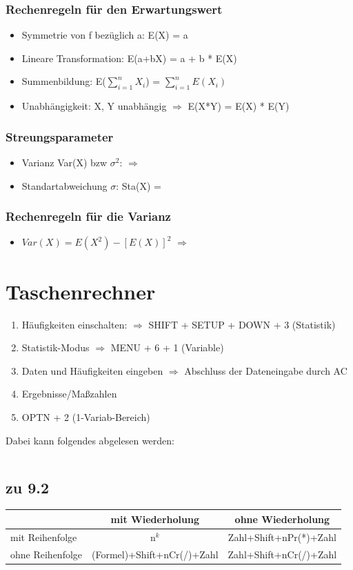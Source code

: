 \documentclass[a4paper,10pt]{scrartcl}
\begin{document}
\subsubsection{Rechenregeln für den Erwartungswert}
\begin{itemize}
    \item Symmetrie von f bezüglich a: E(X) = a
    \item Lineare Transformation: E(a+bX) = a + b * E(X)
    \item Summenbildung: E($\sum_{i=1}^n X_i$) = $\sum_{i=1}^n E(X_i)$
    \item Unabhängigkeit: X, Y unabhängig $\Rightarrow$ E(X*Y) = E(X) * E(Y)
\end{itemize}
\subsubsection{Streungsparameter}
\begin{itemize}
    \item Varianz Var(X) bzw $\sigma^2$:
    $\Rightarrow$ 
    \item Standartabweichung $\sigma$: Sta(X) = 
\end{itemize}

\subsubsection{Rechenregeln für die Varianz}
\begin{itemize}
    \item $Var(X) = E(X^2)- [E(X)]^2$
    $\Rightarrow$ 
\end{itemize}





\section{Taschenrechner}
\begin{enumerate}
    \item Häufigkeiten einschalten:
    $\Rightarrow$ SHIFT + SETUP + DOWN + 3 (Statistik)
    \item Statistik-Modus
    $\Rightarrow$ MENU + 6 + 1 (Variable)
    \item Daten und Häufigkeiten eingeben
    $\Rightarrow$ Abschluss der Dateneingabe durch AC
    \item Ergebnisse/Maßzahlen
    \item OPTN + 2 (1-Variab-Bereich)
\end{enumerate}
Dabei kann folgendes abgelesen werden:
\begin{table}[]
    \begin{tabular}{|r|l|}\hline
    \end{tabular}
\end{table}
\subsection{zu 9.2}
\begin{tabular}{|l|c|c|} \hline
 & mit Wiederholung & ohne Wiederholung \\\hline
mit Reihenfolge & n$^{k}$ & Zahl+Shift+nPr(*)+Zahl \\\hline
ohne Reihenfolge & (Formel)+Shift+nCr(/)+Zahl &  Zahl+Shift+nCr(/)+Zahl \\\hline
\end{tabular}
\end{document}
